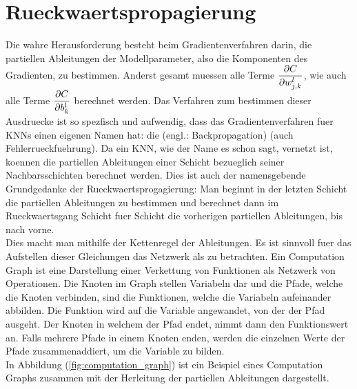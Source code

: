\section{Rueckwaertspropagierung}\label{sec:backpropagation}
Die wahre Herausforderung besteht beim Gradientenverfahren darin,
die partiellen Ableitungen der Modellparameter,
also die Komponenten des Gradienten, zu bestimmen.
Anderst gesamt muessen alle Terme
$\displaystyle\frac{\partial C}{\partial w_{j,k}^l}$, wie auch alle Terme $\displaystyle\frac{\partial C}{\partial b_k^l}$
berechnet werden.
Das Verfahren zum bestimmen dieser Ausdruecke ist so spezfisch und aufwendig,
dass das Gradientenverfahren fuer KNNs einen eigenen Namen hat: die
 (engl.: Backpropagation) (auch Fehlerrueckfuehrung).
\para{}
Da ein KNN, wie der Name es schon sagt, vernetzt ist, koennen die partiellen
Ableitungen einer Schicht bezueglich seiner Nachbarsschichten berechnet werden.
Dies ist auch der namensgebende Grundgedanke der Rueckwaertsprogagierung: Man
beginnt in der letzten Schicht die partiellen Ableitungen zu bestimmen und
berechnet dann im Rueckwaertsgang Schicht fuer Schicht die vorherigen
partiellen Ableitungen, bis nach vorne. \\
Dies macht man mithilfe der Kettenregel der Ableitungen.
Es ist sinnvoll fuer das Aufstellen dieser Gleichungen das Netzwerk als
 zu betrachten.
\para{}
Ein Computation Graph ist eine Darstellung einer Verkettung von Funktionen als Netzwerk von Operationen.
Die Knoten im Graph stellen Variabeln dar und die Pfade, welche die Knoten
verbinden, sind die Funktionen, welche die Variabeln aufeinander abbilden. Die
Funktion wird auf die Variable angewandet, von der der Pfad ausgeht. Der Knoten
in welchem der Pfad endet, nimmt dann den Funktionswert an. Falls
mehrere Pfade in einem Knoten enden, werden die einzelnen Werte der Pfade
zusammenaddiert, um die Variable zu bilden. \\
In Abbildung (\ref{fig:computation_graph}) ist ein Beispiel eines Computation
Graphs zusammen mit der Herleitung der partiellen Ableitungen dargestellt.
\\
